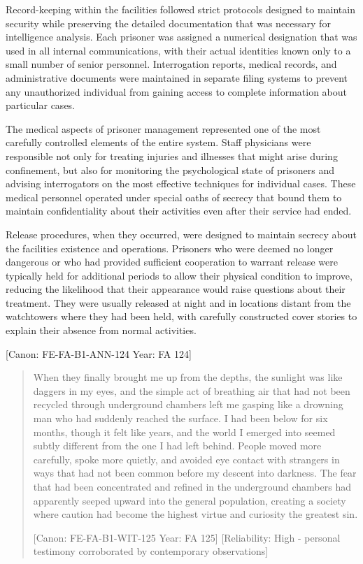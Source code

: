 Record-keeping within the facilities followed strict protocols designed
to maintain security while preserving the detailed documentation that
was necessary for intelligence analysis. Each prisoner was assigned a
numerical designation that was used in all internal communications, with
their actual identities known only to a small number of senior
personnel. Interrogation reports, medical records, and administrative
documents were maintained in separate filing systems to prevent any
unauthorized individual from gaining access to complete information
about particular cases.

The medical aspects of prisoner management represented one of the most
carefully controlled elements of the entire system. Staff physicians
were responsible not only for treating injuries and illnesses that might
arise during confinement, but also for monitoring the psychological
state of prisoners and advising interrogators on the most effective
techniques for individual cases. These medical personnel operated under
special oaths of secrecy that bound them to maintain confidentiality
about their activities even after their service had ended.

Release procedures, when they occurred, were designed to maintain
secrecy about the facilities\textquotesingle{} existence and operations.
Prisoners who were deemed no longer dangerous or who had provided
sufficient cooperation to warrant release were typically held for
additional periods to allow their physical condition to improve,
reducing the likelihood that their appearance would raise questions
about their treatment. They were usually released at night and in
locations distant from the watchtowers where they had been held, with
carefully constructed cover stories to explain their absence from normal
activities.

{[}Canon: FE-FA-B1-ANN-124 \textbar{} Year: FA 124{]}

\begin{quote}
When they finally brought me up from the depths, the sunlight was like
daggers in my eyes, and the simple act of breathing air that had not
been recycled through underground chambers left me gasping like a
drowning man who had suddenly reached the surface. I had been below for
six months, though it felt like years, and the world I emerged into
seemed subtly different from the one I had left behind. People moved
more carefully, spoke more quietly, and avoided eye contact with
strangers in ways that had not been common before my descent into
darkness. The fear that had been concentrated and refined in the
underground chambers had apparently seeped upward into the general
population, creating a society where caution had become the highest
virtue and curiosity the greatest sin.

{[}Canon: FE-FA-B1-WIT-125 \textbar{} Year: FA 125{]} {[}Reliability:
High - personal testimony corroborated by contemporary observations{]}
\end{quote}

